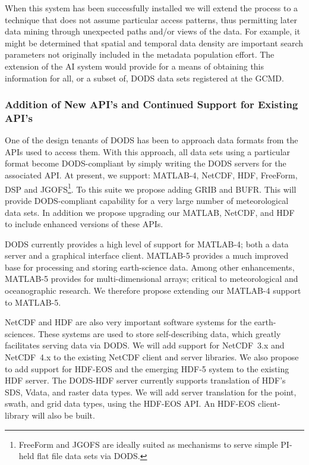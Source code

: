 \documentclass[12pt]{article}
\begin{document}
When this system has been successfully installed we will 
extend the process to a technique that does not assume particular
access patterns, thus permitting later data mining through unexpected 
paths and/or views of the data. For example, it might be determined 
that spatial and temporal data density are important search parameters
not originally included in the metadata population effort. The extension 
of the \ac{AI} system would provide for a means of obtaining this
information for all, or a subset of, \ac{DODS} data sets registered
at the \ac{GCMD}.

\subsubsection{Addition of New \acs{API}'s and Continued Support for 
Existing \acs{API}'s}\label{new-apis}

One of the design tenants of \ac{DODS} has been to approach data
formats from the \acs{API}s used to access them. With this approach,
all data sets using a particular format become \ac{DODS}-compliant 
by simply writing the \ac{DODS} servers for the
associated \acs{API}. At present, we support: \acl{MATLAB}-4, 
\ac{NetCDF}, \acs{HDF}, FreeForm, DSP and \ac{JGOFS}\footnote{FreeForm
and \acs{JGOFS} are ideally suited as mechanisms to serve simple 
\acs{PI}-held flat file data sets via \acs{DODS}.}. To this suite we
propose adding \ac{GRIB} and \ac{BUFR}. This will provide 
\ac{DODS}-compliant capability for a very large number of meteorological
data sets. In addition we propose upgrading our \acl{MATLAB}, 
\ac{NetCDF}, and \acs{HDF} to include enhanced versions of these 
\acs{API}s.

\ac{DODS} currently provides a high level of support for \acl{MATLAB}-4;
both a data server and a graphical interface client. \acl{MATLAB}-5 
provides a much improved base for processing and storing earth-science 
data. Among other enhancements, \acl{MATLAB}-5 provides for 
multi-dimensional arrays; critical to meteorological and oceanographic
research. We therefore propose extending our \acl{MATLAB}-4 support to
\acl{MATLAB}-5.

\ac{NetCDF} and \acs{HDF} are also very important software systems for 
the earth-sciences. These systems are used to store self-describing data, 
which greatly facilitates serving data via \ac{DODS}. We will add 
support for \ac{NetCDF}~3.x and \ac{NetCDF}~4.x to the 
existing \ac{NetCDF} client and server libraries. We also propose to 
add support for \acs{HDF-EOS} and the emerging \acs{HDF}-5 system to
the existing \acs{HDF} server. The \ac{DODS}-\acs{HDF} server 
currently supports translation of \acs{HDF}'s SDS, Vdata, and raster 
data types. We will add server translation for the point, swath, and 
grid data types, using the \acs{HDF-EOS} \acs{API}. An \acs{HDF-EOS} 
client-library will also be built. 
\end{document}
